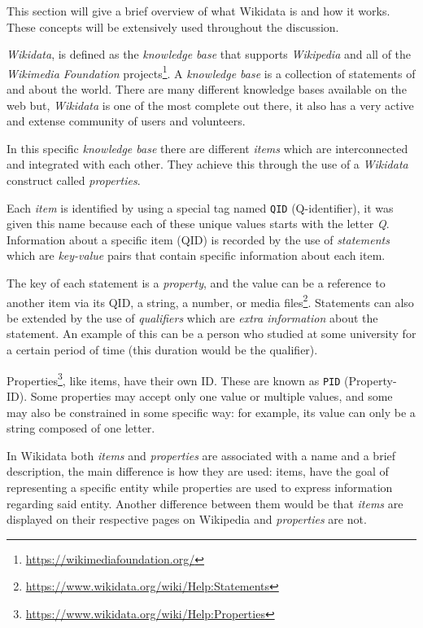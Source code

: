 \documentclass[epsfig,a4paper,11pt,titlepage,twoside,openany]{book}
\newcommand{\footurl}[1]{\footnote{\url{#1}}}
\begin{document}
This section will give a brief overview of what Wikidata is and how it works. These concepts will be extensively used throughout the discussion. 

\textit{Wikidata}, is defined as the \textit{knowledge base} that supports
\textit{Wikipedia} and all of the \textit{Wikimedia Foundation}
projects\footurl{https://wikimediafoundation.org/}. A \textit{knowledge base} is a collection of statements of and about the world. There are many different knowledge bases available on the web but, \textit{Wikidata} is one of the most complete out there, it also has a very active and extense community of users and volunteers. 

In this specific \textit{knowledge base} there are different \textit{items} which are interconnected and integrated with each other. They achieve this through the use of a \textit{Wikidata} construct called 
\textit{properties}. 

Each \textit{item} is identified by using a special tag named \texttt{QID} (Q-identifier), it was given this name because each of these unique values starts with the letter \textit{Q}. Information about a specific item (QID) is
recorded by the use of \textit{statements} which are \textit{key-value} pairs
that contain specific information about each item.

The key of each statement is a \textit{property}, and the value can be a reference to another item via its QID, a string, a number, or media
files\footurl{https://www.wikidata.org/wiki/Help:Statements}. Statements can
also be extended by the use of \textit{qualifiers} which are \textit{extra information} about the
statement. An example of this can be a person who studied at some university for
a certain period of time (this duration would be the qualifier).

Properties\footurl{https://www.wikidata.org/wiki/Help:Properties}, like items,
have their own ID. These are known as \texttt{PID} (Property-ID). Some properties may accept only one value or multiple values, and
some may also be constrained in some specific way: for example, its value can
only be a string composed of one letter.

In Wikidata both \textit{items} and \textit{properties} are associated with a name and a
brief description, the main difference is how they are used: items, have the
goal of representing a specific entity while properties are used to express information regarding said entity. Another difference between them would be that \textit{items} are displayed on their respective pages on Wikipedia and \textit{properties} are not.
\end{document}
